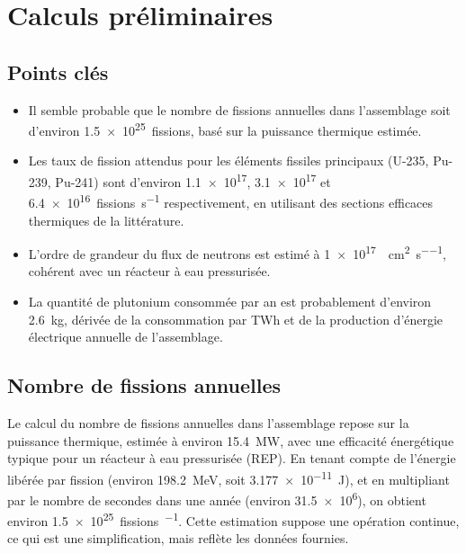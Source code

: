 \section{Calculs préliminaires}

\subsection{Points clés}
\begin{itemize}
  \item Il semble probable que le nombre de fissions annuelles dans l'assemblage soit d'environ \SI{1,5e25}{fissions}, basé sur la puissance thermique estimée.
  \item Les taux de fission attendus pour les éléments fissiles principaux (U-235, Pu-239, Pu-241) sont d'environ \SI{1,1e17}{}, \SI{3,1e17}{} et \SI{6,4e16}{fissions\per\second} respectivement, en utilisant des sections efficaces thermiques de la littérature.
  \item L'ordre de grandeur du flux de neutrons est estimé à \SI{1e17}{\neutron\per\centi\meter\squared\per\second}, cohérent avec un réacteur à eau pressurisée.
  \item La quantité de plutonium consommée par an est probablement d'environ \SI{2,6}{\kilogram}, dérivée de la consommation par TWh et de la production d'énergie électrique annuelle de l'assemblage.
\end{itemize}

\subsection{Nombre de fissions annuelles}
Le calcul du nombre de fissions annuelles dans l'assemblage repose sur la puissance thermique, estimée à environ \SI{15,4}{\mega\watt}, avec une efficacité énergétique typique pour un réacteur à eau pressurisée (REP). En tenant compte de l'énergie libérée par fission (environ \SI{198,2}{\mega\electronvolt}, soit \SI{3,177e-11}{\joule}), et en multipliant par le nombre de secondes dans une année (environ \num{31,5e6}), on obtient environ \SI{1,5e25}{fissions\per\year}. Cette estimation suppose une opération continue, ce qui est une simplification, mais reflète les données fournies.

